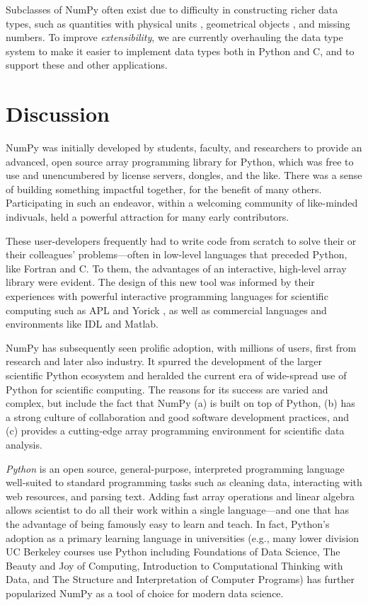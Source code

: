 Subclasses of NumPy often exist due to difficulty in constructing richer data
types, such as quantities with physical units \cite{astropy,Goldbaum2018,pint},
geometrical objects \cite{pygeos}, and missing numbers.
To improve \emph{extensibility}, we are currently overhauling the data type
system to make it easier to implement data types both in Python and C, and to
support these and other applications.

\section*{Discussion}

NumPy was initially developed by students, faculty, and researchers to
provide an advanced, open source array programming library for Python,
which was free to use and unencumbered by license servers, dongles, and the like.
There was a sense of building something
impactful together, for the benefit of many others.  Participating in
such an endeavor, within a welcoming community of like-minded
indivuals, held a powerful attraction for many early contributors.

These user-developers frequently had to write code from scratch to solve
their or their colleagues' problems---often in low-level languages
that preceded Python, like Fortran \cite{dongarra2008netlib} and C.
To them, the advantages of an interactive, high-level array library
were evident. The design of this new tool was informed by their
experiences with powerful interactive programming languages for
scientific computing such as APL \cite{iverson1962programming} and
Yorick \cite{munro1995using}, as well as commercial languages and
environments like IDL and Matlab.

NumPy has subsequently seen prolific adoption, with millions of users,
first from research and later also industry.
It spurred the development of the larger scientific Python ecosystem and
heralded the current era of wide-spread use of Python for scientific computing.
The reasons for its success are varied and complex, but include the fact that
NumPy (a) is built on top of Python,
(b) has a strong culture of collaboration and good software development practices, and
(c) provides a cutting-edge array programming environment for scientific data analysis.

\emph{Python} is an open source, general-purpose, interpreted programming language
well-suited to standard programming tasks such as cleaning data,
interacting with web resources, and parsing text.
Adding fast array operations and linear algebra allows scientist to do all
their work within a single language---and one that has the advantage of
being famously easy to learn and teach.
In fact, Python's adoption as a primary learning language in universities
(e.g., many lower division UC Berkeley courses use Python including
Foundations of Data Science,
The Beauty and Joy of Computing,
Introduction to Computational Thinking with Data,
and The Structure and Interpretation of Computer Programs) has
further popularized NumPy as a tool of choice for modern data science.

